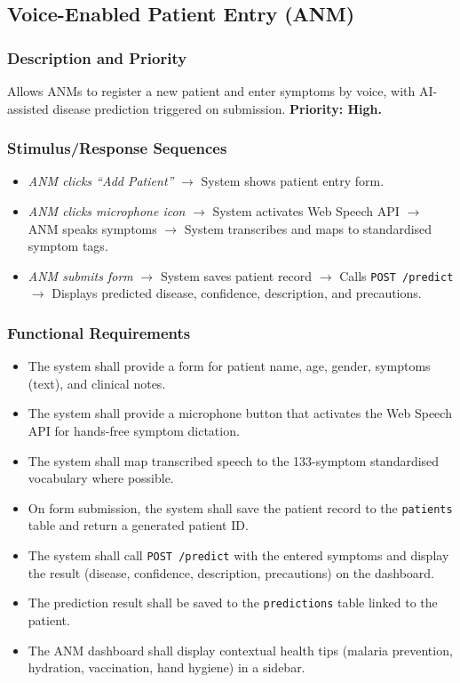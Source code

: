 \documentclass[12pt,a4paper]{article}
\begin{document}
\subsection{Voice-Enabled Patient Entry (ANM)}

\subsubsection{Description and Priority}
Allows ANMs to register a new patient and enter symptoms by voice, with AI-assisted disease prediction triggered on submission. \textbf{Priority: High.}

\subsubsection{Stimulus/Response Sequences}
\begin{itemize}
    \item \textit{ANM clicks ``Add Patient''} $\rightarrow$ System shows patient entry form.
    \item \textit{ANM clicks microphone icon} $\rightarrow$ System activates Web Speech API $\rightarrow$ ANM speaks symptoms $\rightarrow$ System transcribes and maps to standardised symptom tags.
    \item \textit{ANM submits form} $\rightarrow$ System saves patient record $\rightarrow$ Calls \texttt{POST /predict} $\rightarrow$ Displays predicted disease, confidence, description, and precautions.
\end{itemize}

\subsubsection{Functional Requirements}
\begin{itemize}
    \item[\texttt{REQ-ANM-01}] The system shall provide a form for patient name, age, gender, symptoms (text), and clinical notes.
    \item[\texttt{REQ-ANM-02}] The system shall provide a microphone button that activates the Web Speech API for hands-free symptom dictation.
    \item[\texttt{REQ-ANM-03}] The system shall map transcribed speech to the 133-symptom standardised vocabulary where possible.
    \item[\texttt{REQ-ANM-04}] On form submission, the system shall save the patient record to the \texttt{patients} table and return a generated patient ID.
    \item[\texttt{REQ-ANM-05}] The system shall call \texttt{POST /predict} with the entered symptoms and display the result (disease, confidence, description, precautions) on the dashboard.
    \item[\texttt{REQ-ANM-06}] The prediction result shall be saved to the \texttt{predictions} table linked to the patient.
    \item[\texttt{REQ-ANM-07}] The ANM dashboard shall display contextual health tips (malaria prevention, hydration, vaccination, hand hygiene) in a sidebar.
\end{itemize}
\end{document}
